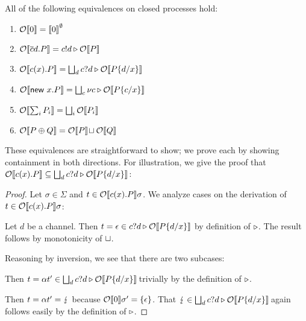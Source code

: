 \documentclass{entcs}
\begin{document}
\begin{lemma}
All of the following equivalences on closed processes hold:
\begin{enumerate}
\item $\ObB{0} = \Sem{0}{\emptyset}$
\item $\ObB{\ov{c}d.P} = c!d \pref \ObB{P}$
\item $\ObB{c(x).P} = \biglub_d c?d \pref \ObB{P\{d/x\}}$
\item $\ObB{\new x.P} = \biglub_c \nu c \pref \ObB{P\{c/x\}}$
\item $\ObB{\sum_i P_i} = \biglub_i \ObB{P_i}$
\item $\ObB{P \nc Q} = \Ob{P} \lub \ObB{Q}$
\end{enumerate}
\end{lemma}
\noindent
These equivalences are straightforward to show; we prove each by
showing containment in both directions.  For illustration, we give the
proof that $\ObB{c(x).P} \subseteq \biglub_d c?d \pref \ObB{P\{d/x\}}$:
\begin{proof}
Let $\sigma \in \Sigma$ and $t \in \Ob{c(x).P}{\sigma}$.  
We analyze cases on the derivation of $t \in \Ob{c(x).P}{\sigma}$:


\vskip 2pt\noindent
Let $d$ be a channel.  Then $t = \epsilon \in c?d \pref
\ObB{P\{d/x\}}$ by definition of $\pref$.  The result follows by
monotonicity of $\lub$.


\vskip 2pt

Reasoning by inversion, we see that there are two subcases:


\vskip 4pt

Then $t = \alpha t' \in \biglub_d c?d \pref \Ob{P\{d/x\}}$ trivially
by the definition of $\pref$.


\vskip 4pt

Then $t = \alpha t' = \fault$ because $\Ob{0}{\sigma'} = \{ \epsilon
\}$.  That $\fault \in \biglub_d c?d \pref \Ob{P\{d/x\}}$ again
follows easily by the definition of $\pref$.
\end{proof}
\end{document}
